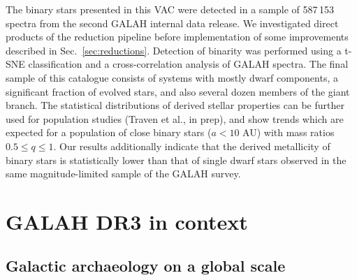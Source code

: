 \documentclass[fleqn,usenatbib,useAMS]{mnras}
\begin{document}
The binary stars presented in this VAC were detected in a sample of 587\,153 spectra from the second GALAH internal data release. We investigated direct products of the reduction pipeline before implementation of some improvements described in Sec.~\ref{sec:reductions}. Detection of binarity was performed using a t-SNE classification and a cross-correlation analysis \citep{Merle2017, Traven2017} of GALAH spectra. The final sample of this catalogue consists of systems with mostly dwarf components, a significant fraction of evolved stars, and also several dozen members of the giant branch.  The statistical distributions of derived stellar properties can be further used for population studies (Traven et al., in prep), and show trends which are expected for a population of close binary stars ($a < 10$ AU) with mass ratios $0.5 \leq q \leq 1$. Our results additionally indicate that the derived metallicity of binary stars is statistically lower than that of single dwarf stars observed in the same magnitude-limited sample of the GALAH survey.

\section{GALAH DR3 in context} \label{sec:galah_in_context}

\subsection{Galactic archaeology on a global scale}  \label{sec:global_ga}
\end{document}
